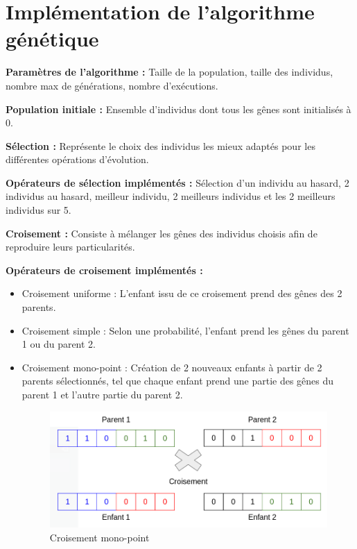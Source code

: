 \documentclass[12pt]{article}
\begin{document}
\section{Implémentation de l'algorithme génétique}
\begin{description}

\item{\textbf{Paramètres de l'algorithme :}} Taille de la population, taille des individus, nombre max de générations, nombre d'exécutions.

\item{\textbf{Population initiale :}} Ensemble d'individus dont tous les gênes sont initialisés à 0.

\item{\textbf{Sélection :}} Représente le choix des individus les mieux adaptés pour les différentes opérations d'évolution.
\item{\textbf{Opérateurs de sélection implémentés :}}  Sélection d'un individu au hasard, 2 individus au hasard, meilleur individu, 2 meilleurs individus et les 2 meilleurs individus sur 5.

\item{\textbf{Croisement :}} Consiste à mélanger les gênes des individus choisis afin de reproduire leurs particularités.
\item{\textbf{Opérateurs de croisement implémentés :}}
\begin{itemize}[label=-]
\item Croisement uniforme : L'enfant issu de ce croisement prend des gênes des 2 parents.
\item Croisement simple : Selon une probabilité, l'enfant prend les gênes du parent 1 ou du parent 2.
\item Croisement mono-point : Création de 2 nouveaux enfants à partir de 2 parents sélectionnés, tel que chaque enfant prend une partie des gênes du parent 1 et l'autre partie du parent 2.

\begin{figure}[H]
		\begin{center}
			\includegraphics[scale=0.4]{img/crois_mono_point.png}
			\caption{Croisement mono-point}
			\label{crois_mono-point}
		\end{center}
\end{figure}


\end{itemize}
\end{description}
\end{document}
